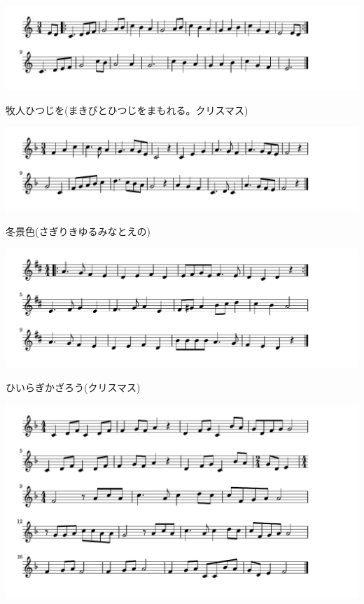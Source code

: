 \documentclass[a4paper]{ltjsarticle}
\begin{document}
\includegraphics[clip]{makibito_crop.pdf}

\vspace{-10mm} \hspace{10mm}
牧人ひつじを(まきびとひつじをまもれる。クリスマス)

\includegraphics[clip]{fuyugeshiki_crop.pdf}

\vspace{-10mm} \hspace{10mm}
冬景色(さぎりきゆるみなとえの)

\includegraphics[clip]{hiiragi_crop.pdf}

\vspace{-10mm} \hspace{10mm}
ひいらぎかざろう(クリスマス)

\includegraphics[clip]{nadasoso_crop.pdf}
\end{document}
